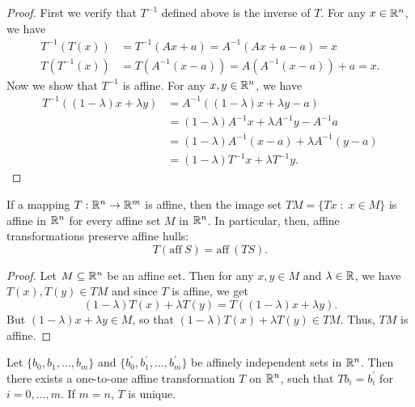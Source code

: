 \documentclass[11pt,a4paper]{article}
\begin{document}
\begin{proof}
    First we verify that $T^{-1}$ defined above is the inverse of $T$. For any $x\in\mathbb{R}^n$, we have
    \begin{align*}
        T^{-1}(T(x)) &= T^{-1}(Ax+a) = A^{-1}(Ax+a-a) = x \\
        T(T^{-1}(x)) &= T(A^{-1}(x-a)) = A(A^{-1}(x-a)) + a = x.
    \end{align*}
% 
    Now we show that $T^{-1}$ is affine. For any $x,y\in \mathbb{R}^n$, we have
    \begin{align*}
        T^{-1}((1-\lambda)x + \lambda y) &= A^{-1}((1-\lambda)x + \lambda y - a)\\
        &= (1-\lambda)A^{-1}x + \lambda A^{-1} y - A^{-1} a \\
        &= (1-\lambda)A^{-1}(x-a) + \lambda A^{-1} (y-a) \\
        &= (1-\lambda)T^{-1}x + \lambda T^{-1} y.
    \end{align*}
\end{proof}

\begin{proposition}
    If a mapping $T:\mathbb{R}^n\rightarrow \mathbb{R}^m$ is affine, then the image set $TM = \{Tx\;:\;x\in M\}$ is affine in $\mathbb{R}^n$ for every affine set $M$ in $\mathbb{R}^n$. In particular, then, affine transformations preserve affine hulls:
    \begin{equation*}
        T(\mathrm{aff}\ S) = \mathrm{aff}\ (TS).
    \end{equation*}
\end{proposition}

\begin{proof}
    Let $M\subseteq \mathbb{R}^n$ be an affine set. Then for any $x,y\in M$ and $\lambda\in\mathbb{R}$, we have $T(x),T(y)\in TM$ and since $T$ is affine, we get 
    \begin{equation*}
        (1-\lambda)T(x) + \lambda T(y) = T((1-\lambda)x + \lambda y).
    \end{equation*}
    But $(1-\lambda)x + \lambda y\in M$, so that $(1-\lambda)T(x) + \lambda T(y)\in TM$. Thus, $TM$ is affine.
\end{proof}

\begin{theorem}
    Let $\{b_0,b_1,\ldots,b_m\}$ and $\{b_0^\prime,b_1^\prime,\ldots, b_m^\prime\}$ be affinely independent sets in $\mathbb{R}^n$. Then there exists a one-to-one affine transformation $T$ on $\mathbb{R}^n$, such that $Tb_i = b_i^\prime$ for $i = 0,\ldots,m$. If $m = n$, $T$ is unique.
\end{theorem}
\end{document}
